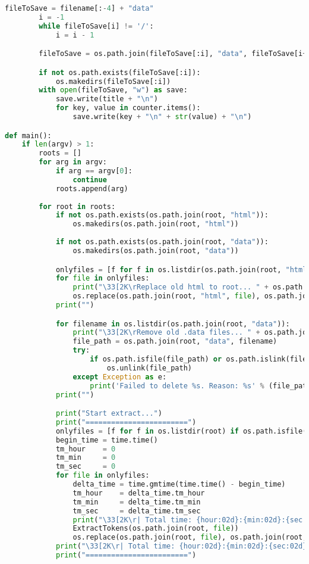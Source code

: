 \begin{lstlisting}[language=Python]
        fileToSave = filename[:-4] + "data"
        i = -1
        while fileToSave[i] != '/':
            i = i - 1

        fileToSave = os.path.join(fileToSave[:i], "data", fileToSave[i+1:])

        if not os.path.exists(fileToSave[:i]):
            os.makedirs(fileToSave[:i])
        with open(fileToSave, "w") as save:
            save.write(title + "\n")
            for key, value in counter.items():
                save.write(key + "\n" + str(value) + "\n")

def main():
    if len(argv) > 1:
        roots = []
        for arg in argv:
            if arg == argv[0]:
                continue
            roots.append(arg)
            
        for root in roots:
            if not os.path.exists(os.path.join(root, "html")):
                os.makedirs(os.path.join(root, "html"))
            
            if not os.path.exists(os.path.join(root, "data")):
                os.makedirs(os.path.join(root, "data"))

            onlyfiles = [f for f in os.listdir(os.path.join(root, "html")) if os.path.isfile(os.path.join(root, "html", f))]
            for file in onlyfiles:
                print("\33[2K\rReplace old html to root... " + os.path.join(root, "html", file) + " to " + os.path.join(root, file), end="")
                os.replace(os.path.join(root, "html", file), os.path.join(root, file))
            print("")

            for filename in os.listdir(os.path.join(root, "data")):
                print("\33[2K\rRemove old .data files... " + os.path.join(root, "data", filename), end="")
                file_path = os.path.join(root, "data", filename)
                try:
                    if os.path.isfile(file_path) or os.path.islink(file_path):
                        os.unlink(file_path)
                except Exception as e:
                    print('Failed to delete %s. Reason: %s' % (file_path, e))
            print("")

            print("Start extract...")
            print("========================")
            onlyfiles = [f for f in os.listdir(root) if os.path.isfile(os.path.join(root, f))]
            begin_time = time.time()
            tm_hour    = 0
            tm_min     = 0
            tm_sec     = 0
            for file in onlyfiles:
                delta_time = time.gmtime(time.time() - begin_time)
                tm_hour    = delta_time.tm_hour
                tm_min     = delta_time.tm_min
                tm_sec     = delta_time.tm_sec
                print("\33[2K\r| Total time: {hour:02d}:{min:02d}:{sec:02d} | Extract {path}...".format(hour=tm_hour, min=tm_min, sec=tm_sec, path=os.path.join(root, file)), end="")
                ExtractTokens(os.path.join(root, file))
                os.replace(os.path.join(root, file), os.path.join(root, "html", file))
            print("\33[2K\r| Total time: {hour:02d}:{min:02d}:{sec:02d} |".format(hour=tm_hour, min=tm_min, sec=tm_sec))
            print("========================")
        

\end{lstlisting}
